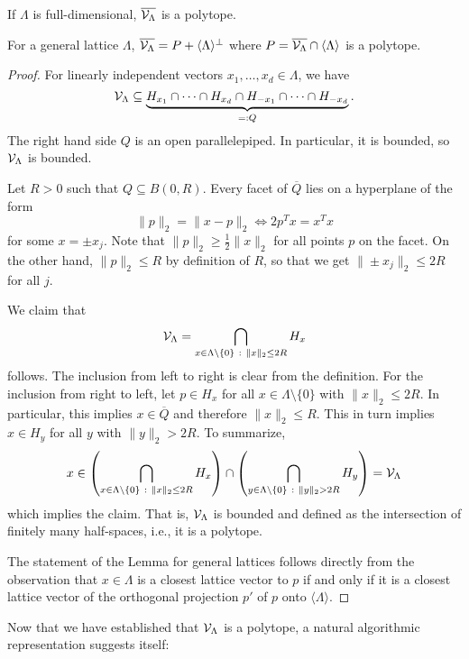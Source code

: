 \begin{lemma}
  If $\Lambda$ is full-dimensional, $\overline{\mathcal{V}_\Lambda}$ is a polytope.

  For a general lattice $\Lambda$,
  $\overline{\mathcal{V}_\Lambda} = P + \langle \Lambda \rangle^\bot$
  where $P = \overline{\mathcal{V}_\Lambda} \cap \langle \Lambda \rangle$ is a polytope.
\end{lemma}
\begin{proof}
  For linearly independent vectors $x_1, \ldots, x_d \in \Lambda$,
  we have
  \[
    \mathcal{V}_\Lambda \subseteq
      \underbrace{H_{x_1} \cap \dots \cap H_{x_d} \cap H_{-x_1} \cap \dots \cap H_{-x_d}}_{=: Q}.
  \]
  The right hand side $Q$ is an open parallelepiped.
  In particular, it is bounded, so $\mathcal{V}_\Lambda$ is bounded.

  Let $R > 0$ such that $Q \subseteq B(0,R)$.
  Every facet of $\overline{Q}$ lies on a hyperplane of the form
  \[
    \|p\|_2 = \|x - p\|_2 \iff 2p^Tx = x^Tx
  \]
  for some $x = \pm x_j$.
  Note that $\|p\|_2 \geq \frac{1}{2} \|x\|_2$ for all points $p$ on the facet.
  On the other hand, $\|p\|_2 \leq R$ by definition of $R$,
  so that we get $\|\pm x_j\|_2 \leq 2R$ for all $j$.

  We claim that
  \[
    \mathcal{V}_\Lambda = \bigcap_{x \in \Lambda\setminus\{0\} ~:~ \|x\|_2 \leq 2R} H_x
  \]
  follows.
  The inclusion from left to right is clear from the definition.
  For the inclusion from right to left,
  let $p \in H_x$ for all $x \in \Lambda\setminus\{0\}$ with $\|x\|_2 \leq 2R$.
  In particular, this implies $x \in \overline{Q}$ and therefore $\|x\|_2 \leq R$.
  This in turn implies $x \in H_y$ for all $y$ with $\|y\|_2 > 2R$.
  To summarize,
  \[
     x \in \left( \bigcap_{x \in \Lambda\setminus\{0\} ~:~ \|x\|_2 \leq 2R} H_x \right)
      \cap \left( \bigcap_{y \in \Lambda\setminus\{0\} ~:~ \|y\|_2 > 2R} H_y \right) = \mathcal{V}_\Lambda
  \]
  which implies the claim.
  That is, $\mathcal{V}_\Lambda$ is bounded and defined as the intersection of finitely many half-spaces,
  i.e., it is a polytope.

  The statement of the Lemma for general lattices follows
  directly from the observation that $x \in \Lambda$ is a closest lattice vector to $p$
  if and only if it is a closest lattice vector of the orthogonal projection $p'$ of $p$
  onto $\langle \Lambda \rangle$.
\end{proof}

Now that we have established that $\mathcal{V}_\Lambda$ is a polytope,
a natural algorithmic representation suggests itself:

